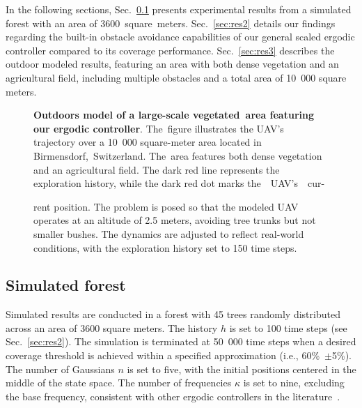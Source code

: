 \documentclass[letterpaper,10pt,conference,twoside]{IEEEtran}
\theoremstyle{definition}
\begin{document}
In the following sections, Sec.~\ref{sec:res1} presents experimental results from a simulated forest with an area of 3600~square~meters. Sec.~\ref{sec:res2} details our findings regarding the built-in obstacle avoidance capabilities of our general scaled ergodic controller compared to its coverage performance. Sec.~\ref{sec:res3} describes the outdoor modeled results, featuring an area with both dense vegetation and an agricultural field, including multiple obstacles and a total area of 10~000 square meters.

\begin{figure}[t!]
  \begin{minipage}[t!]{.67\columnwidth}
    \vspace*{-.15cm}
    \hspace*{.1cm}
  \end{minipage}\hspace*{.15cm}
  \begin{minipage}[t!]{.31\columnwidth}
    \caption[.]{\textbf{Outdoors model of a large-scale vegetated~area featuring our ergodic controller}. The~figure illustrates the UAV's trajectory over a 10~000 square-meter area located in Birmensdorf,~Switzerland. The~area features both dense vegetation and an agricultural field. The dark red line represents the exploration history, while the dark red dot marks the~~UAV's~~cur-
    }
    \vspace*{-.2cm}
    \label{fig:2}
  \end{minipage}
  \vspace*{-.18cm}
  \caption*{\footnotesize rent position. The problem is posed so that the modeled UAV operates at an altitude of 2.5 meters, avoiding tree trunks but not smaller bushes. The dynamics are adjusted to reflect real-world conditions, with the exploration history set to 150 time steps.}
\end{figure}

\subsection{Simulated forest}\label{sec:res1}
\noindent
Simulated results are conducted in a forest with 45 trees randomly distributed across an area of 3600 square meters. The history $h$ is set to 100 time steps (see Sec.~\ref{sec:res2}). The simulation is terminated at 50~000 time steps when a desired coverage threshold is achieved within a specified approximation (i.e., 60\%~$\pm$5\%). The number of Gaussians $n$ is set to five, with the initial positions centered in the middle of the state space. The number of frequencies $\kappa$ is set to nine, excluding the base frequency, consistent with other ergodic controllers in the literature~\cite{seewald2024energy}. 
\end{document}
